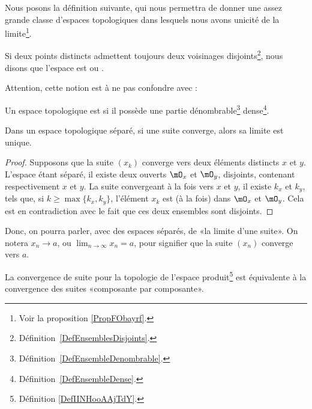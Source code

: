 Nous posons la définition suivante, qui nous permettra de donner une assez grande classe d'espaces topologiques dans lesquels nous avons unicité de la limite\footnote{Voir la proposition \ref{PropFObayrf}.}.
\begin{definition}  \label{DefYFmfjjm}\label{DefWEOTrVl}
    Si deux points distincts admettent toujours deux voisinages disjoints\footnote{Définition~\ref{DefEnsemblesDisjoints}.}, nous disons que l'espace est  ou .
\end{definition}

Attention, cette notion est à ne pas confondre avec :
\begin{definition}  \label{DefUADooqilFK}
    Un espace topologique est  si il possède une partie dénombrable\footnote{Définition~\ref{DefEnsembleDenombrable}.} dense\footnote{Définition~\ref{DefEnsembleDense}.}.
\end{definition}

\begin{proposition}\label{PropUniciteLimitePourSuites}
  Dans un espace topologique séparé, si une suite converge, alors sa limite est unique.
\end{proposition}
\begin{proof}
  Supposons que la suite \( (x_k)\) converge vers deux éléments distincts \( x \) et \( y \). L'espace étant séparé, il existe deux ouverts \( \mO_x \) et \( \mO_y \), disjoints, contenant respectivement \( x \) et \( y \). La suite convergeant à la fois vers \( x \) et \( y \), il existe \( k_x \) et \( k_y \), tels que, si \( k \geq \max\{k_x, k_y\} \), l'élément  \( x_k \) est (à la fois) dans  \( \mO_x \) et \( \mO_y \). Cela est en contradiction avec le fait que ces deux ensembles sont disjoints.
\end{proof}

\begin{normaltext}
  Donc, on pourra parler, avec des espaces séparés, de «la limite d'une suite». On notera \( x_n\to a\), ou \(\lim_{n\to \infty} x_n = a \), pour signifier que la suite \( (x_n) \) converge vers \( a \). 
\end{normaltext}

\begin{proposition}      \label{PROPooNRRIooCPesgO}
    La convergence de suite pour la topologie de l'espace produit\footnote{Définition \ref{DefIINHooAAjTdY}.} est équivalente à la convergence des suites «composante par composante».
\end{proposition}

